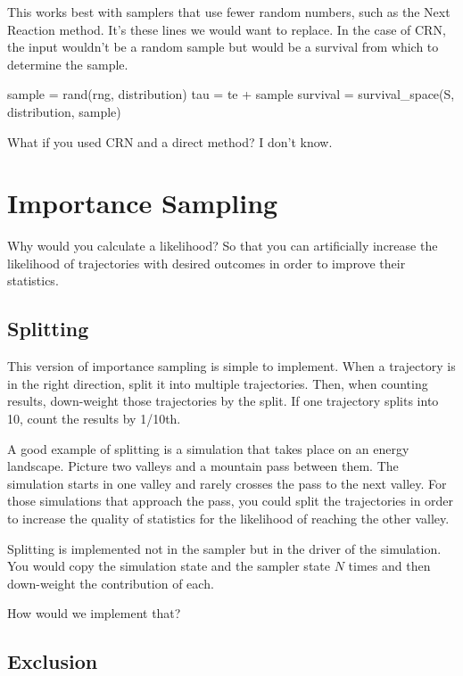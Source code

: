 \documentclass{article}
\begin{document}
This works best with samplers that use fewer random numbers, such as the Next Reaction method. It's these lines we would want to replace. In the case of CRN, the input wouldn't be a random sample but would be a survival from which to determine the sample.

\begin{jllisting}
sample = rand(rng, distribution)
tau = te + sample
survival = survival_space(S, distribution, sample)
\end{jllisting}

What if you used CRN and a direct method? I don't know.


\section{Importance Sampling}

Why would you calculate a likelihood? So that you can artificially increase the likelihood of trajectories with desired outcomes in order to improve their statistics.

\subsection{Splitting}

This version of importance sampling is simple to implement. When a trajectory is in the right direction, split it into multiple trajectories. Then, when counting results, down-weight those trajectories by the split. If one trajectory splits into 10, count the results by 1/10th.

A good example of splitting is a simulation that takes place on an energy landscape. Picture two valleys and a mountain pass between them. The simulation starts in one valley and rarely crosses the pass to the next valley. For those simulations that approach the pass, you could split the trajectories in order to increase the quality of statistics for the likelihood of reaching the other valley.

Splitting is implemented not in the sampler but in the driver of the simulation. You would copy the simulation state and the sampler state $N$ times and then down-weight the contribution of each.

How would we implement that?


\subsection{Exclusion}
\end{document}
